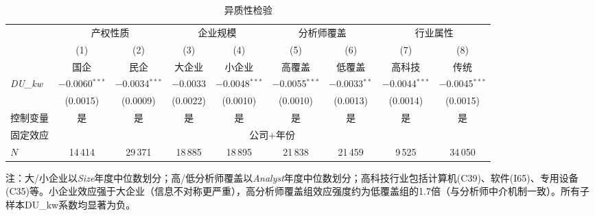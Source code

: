 \documentclass[11pt,a4paper]{article}
\begin{document}
\begin{table}[htbp]
\centering
\caption{异质性检验}
\label{tab:hetero}
\footnotesize
\setlength{\tabcolsep}{3.5pt}
\begin{tabular}{l*{8}{c}}
\toprule
 & \multicolumn{2}{c}{产权性质} & \multicolumn{2}{c}{企业规模} & \multicolumn{2}{c}{分析师覆盖} & \multicolumn{2}{c}{行业属性} \\
\cmidrule(lr){2-3}\cmidrule(lr){4-5}\cmidrule(lr){6-7}\cmidrule(lr){8-9}
 & (1) & (2) & (3) & (4) & (5) & (6) & (7) & (8) \\
 & 国企 & 民企 & 大企业 & 小企业 & 高覆盖 & 低覆盖 & 高科技 & 传统 \\
\midrule
\textit{DU\_kw}
 & $-$0.0060$^{***}$ & $-$0.0034$^{***}$ & $-$0.0033 & $-$0.0048$^{***}$ & $-$0.0055$^{***}$ & $-$0.0033$^{**}$ & $-$0.0044$^{***}$ & $-$0.0045$^{***}$ \\
 & (0.0015) & (0.0009) & (0.0022) & (0.0010) & (0.0010) & (0.0013) & (0.0014) & (0.0015) \\[6pt]
\midrule
控制变量 & 是 & 是 & 是 & 是 & 是 & 是 & 是 & 是 \\
固定效应 & \multicolumn{8}{c}{公司+年份} \\
$N$ & 14\,414 & 29\,371 & 18\,885 & 18\,895 & 21\,838 & 21\,459 & 9\,525 & 34\,050 \\
\bottomrule
\end{tabular}

\vspace{4pt}
{\footnotesize 注：大/小企业以\textit{Size}年度中位数划分；高/低分析师覆盖以\textit{Analyst}年度中位数划分；高科技行业包括计算机(C39)、软件(I65)、专用设备(C35)等。小企业效应强于大企业（信息不对称更严重），高分析师覆盖组效应强度约为低覆盖组的1.7倍（与分析师中介机制一致）。所有子样本DU\_kw系数均显著为负。}
\end{table}


\FloatBarrier
\end{document}
